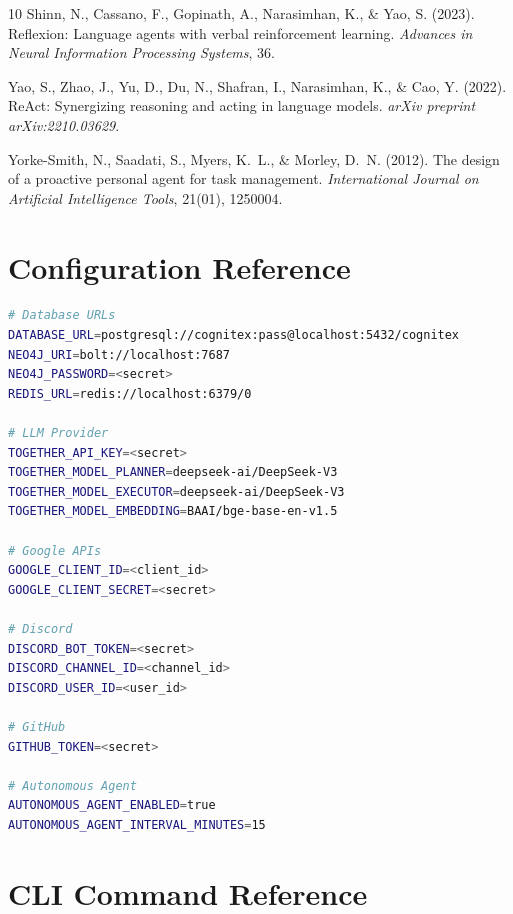 \documentclass[11pt,a4paper]{article}
\begin{document}
\begin{thebibliography}{10}
Shinn, N., Cassano, F., Gopinath, A., Narasimhan, K., \& Yao, S. (2023).
\newblock Reflexion: Language agents with verbal reinforcement learning.
\newblock \emph{Advances in Neural Information Processing Systems}, 36.

Yao, S., Zhao, J., Yu, D., Du, N., Shafran, I., Narasimhan, K., \& Cao, Y. (2022).
\newblock ReAct: Synergizing reasoning and acting in language models.
\newblock \emph{arXiv preprint arXiv:2210.03629}.

Yorke-Smith, N., Saadati, S., Myers, K.~L., \& Morley, D.~N. (2012).
\newblock The design of a proactive personal agent for task management.
\newblock \emph{International Journal on Artificial Intelligence Tools}, 21(01), 1250004.

\end{thebibliography}

\appendix

\section{Configuration Reference}
\label{app:config}

\begin{lstlisting}[language=bash,caption={Environment configuration variables}]
# Database URLs
DATABASE_URL=postgresql://cognitex:pass@localhost:5432/cognitex
NEO4J_URI=bolt://localhost:7687
NEO4J_PASSWORD=<secret>
REDIS_URL=redis://localhost:6379/0

# LLM Provider
TOGETHER_API_KEY=<secret>
TOGETHER_MODEL_PLANNER=deepseek-ai/DeepSeek-V3
TOGETHER_MODEL_EXECUTOR=deepseek-ai/DeepSeek-V3
TOGETHER_MODEL_EMBEDDING=BAAI/bge-base-en-v1.5

# Google APIs
GOOGLE_CLIENT_ID=<client_id>
GOOGLE_CLIENT_SECRET=<secret>

# Discord
DISCORD_BOT_TOKEN=<secret>
DISCORD_CHANNEL_ID=<channel_id>
DISCORD_USER_ID=<user_id>

# GitHub
GITHUB_TOKEN=<secret>

# Autonomous Agent
AUTONOMOUS_AGENT_ENABLED=true
AUTONOMOUS_AGENT_INTERVAL_MINUTES=15
\end{lstlisting}

\section{CLI Command Reference}
\label{app:cli}
\end{document}
